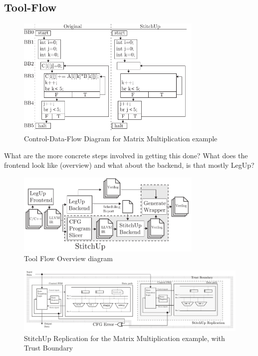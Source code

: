 \subsection{Tool-Flow}
\begin{figure}
\centering
\includegraphics[width=3.5in]{./imgs/mmm_cdfg.pdf}
\caption{Control-Data-Flow Diagram for Matrix Multiplication example}
\label{fig:mmm_cdfg}
\end{figure}

What are the more concrete steps involved in getting this done?
What does the frontend look like (overview) and what about the backend,
is that mostly LegUp?

\begin{figure}
\centering
\includegraphics[width=3.5in]{./imgs/tool-flow.pdf}
\caption{Tool Flow Overview diagram}
\label{fig:tool_flow_diagram}
\end{figure}



\begin{figure}[!t]
\centering
\includegraphics[width=7in]{./imgs/HLSArch.pdf}
\caption{StitchUp Replication for the Matrix Multiplication example, with Trust Boundary}
\label{fig:HLSArch}
\end{figure}

